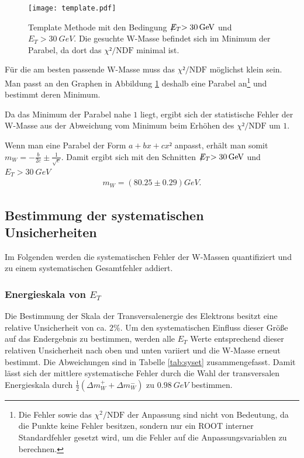 \documentclass[a4paper,12pt]{article}
\newcommand{\met}{\ensuremath{\not\mathrel{E}}_T}
\begin{document}
\begin{figure}[htb]
	\centering
	\texttt{[image: template.pdf]}
	\caption{Template Methode mit den Bedingung $\met > \SI{30}{GeV}$ und $E_{T} > \SI{30}{GeV}$. Die gesuchte W-Masse befindet sich im Minimum der Parabel, da dort
		das $χ²/\text{NDF}$ minimal ist.}
	\label{fig:template}
\end{figure}

Für die am besten passende W-Masse muss das $χ²/\text{NDF}$ möglichst klein sein. Man passt an den
Graphen in Abbildung \ref{fig:template} deshalb eine Parabel an\footnote{Die Fehler sowie das $χ^2/\text{NDF}$ der Anpassung sind nicht von Bedeutung, da die Punkte keine
Fehler besitzen, sondern nur ein ROOT interner Standardfehler gesetzt wird, um die Fehler auf die
Anpassungsvariablen zu berechnen.}
und bestimmt deren Minimum.

Da das Minimum der Parabel nahe $1$ liegt, ergibt sich der statistische Fehler der W-Masse aus der Abweichung vom Minimum beim Erhöhen des
$χ²/\text{NDF}$ um $1$.

Wenn man eine Parabel der Form $a + bx + cx²$ anpasst, erhält man somit $m_W = -\frac{b}{2c} ±
\frac{1}{\sqrt{c}}$.
Damit ergibt sich mit den Schnitten $\met > \SI{30}{GeV}$ und $E_{T} > \SI{30}{GeV}$
\begin{align*}
	m_W =  ( 80.25 ± 0.29  ) \si{GeV}.
\end{align*}

\subsection{Bestimmung der systematischen Unsicherheiten}
\label{sysunc}
Im Folgenden werden die systematischen Fehler der W-Massen quantifiziert und zu einem systematischen
Gesamtfehler addiert.
\subsubsection*{Energieskala von $E_{T}$}
Die Bestimmung der Skala der Transversalenergie des Elektrons besitzt eine relative Unsicherheit von ca. $2\%$\cite{Abachi:1996ey}. Um den systematischen Einfluss
dieser Größe auf das Endergebnis zu bestimmen, werden alle $E_{T}$ Werte entsprechend dieser relativen Unsicherheit nach oben und unten variiert und die
W-Masse erneut bestimmt. Die Abweichungen sind in Tabelle \ref{tab:syset} zusammengefasst. Damit lässt sich der mittlere systematische Fehler durch die
Wahl der transversalen Energieskala durch $\frac12(Δm_W^+ + Δm_W^-)$ zu $\SI{0.98}{GeV}$ bestimmen.
\end{document}
